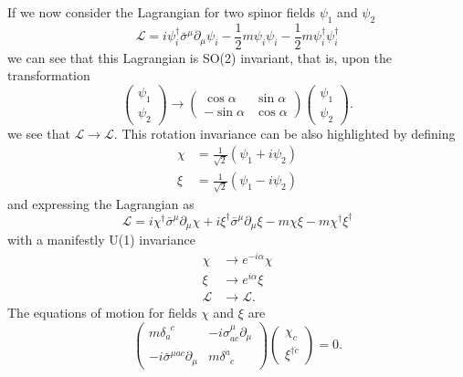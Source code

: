 If we now consider the Lagrangian for two spinor fields $\psi_1$ and $\psi_2$
\begin{equation}
    \mathcal{L}=i\psi^\dagger_i\bar{\sigma}^\mu\partial_\mu\psi_i-\frac{1}{2}m\psi_i\psi_i-\frac{1}{2}m\psi_i^\dagger\psi_i^\dagger
\end{equation}
we can see that this Lagrangian is SO(2) invariant, that is, upon the transformation
\begin{equation}
\left(\begin{array}{l}
\psi_{1} \\
\psi_{2}
\end{array}\right) \rightarrow\left(\begin{array}{rr}
\cos \alpha & \sin \alpha \\
-\sin \alpha & \cos \alpha
\end{array}\right)\left(\begin{array}{l}
\psi_{1} \\
\psi_{2}
\end{array}\right) .
\end{equation}
we see that $\mathcal{L}\to\mathcal{L}$. This rotation invariance can be also highlighted by defining 
\begin{equation}
    \begin{aligned}
    \chi&=\frac{1}{\sqrt{2}}(\psi_1+i\psi_2)\\
    \xi&=\frac{1}{\sqrt{2}}(\psi_1-i\psi_2)
    \end{aligned}
\end{equation}
and expressing the Lagrangian as
\begin{equation}
    \mathcal{L}=i\chi^\dagger\bar{\sigma}^\mu\partial_\mu\chi+i\xi^\dagger\bar{\sigma}^\mu\partial_\mu\xi-m\chi\xi-m\chi^\dagger\xi^\dagger
    \label{dirac_lagrangian_weyl}
\end{equation}
with a manifestly U(1) invariance
\begin{equation}
    \begin{aligned}
    \chi&\to e^{-i\alpha}\chi\\
    \xi&\to e^{i\alpha}\xi\\
    \mathcal{L}&\to\mathcal{L}.
    \end{aligned}
\end{equation}
The equations of motion for fields $\chi$ and $\xi$ are
\begin{equation}
\left(\begin{array}{cc}
m \delta_{a}^{\phantom{a}c} & -i \sigma_{a \dot{c}}^{\mu} \partial_{\mu} \\
-i \bar{\sigma}^{\mu \dot{a} c} \partial_{\mu} & m \delta^{\dot{a}}_{\phantom{a}\dot{c}}
\end{array}\right)\left(\begin{array}{c}
\chi_{c} \\
\xi^{\dagger \dot{c}}
\end{array}\right)=0.
\end{equation}
